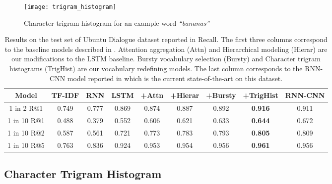 \documentclass[11pt]{report}
\renewcommand\cite{\citep}	%
\begin{document}
\begin{figure}
\texttt{[image: trigram\_histogram]}
\caption{Character trigram histogram for an example word \textit{``bananas''}}
\label{fig:trigram_histogram}
\vspace{-1.0em}
\end{figure}

\begin{table}
\begin{tabular}{  c | c | c | c | c | c | c | c | c }
Model & TF-IDF & RNN & LSTM & +Attn & +Hierar & +Bursty & +TrigHist & RNN-CNN \\ \hline
1 in 2 R@1 & 0.749 & 0.777 & 0.869 & 0.874 & 0.887 & 0.892 & \textbf{0.916} & 0.911\\ 
1 in 10 R@1 & 0.488 & 0.379 & 0.552 & 0.606 & 0.621 & 0.633 & \textbf{0.644} & 0.672\\
1 in 10 R@2 & 0.587 & 0.561 & 0.721 & 0.773 & 0.783 & 0.793 & \textbf{0.805} & 0.809\\ 
1 in 10 R@5 & 0.763 & 0.836 & 0.924 & 0.953 & 0.954 & 0.956 & \textbf{0.961} & 0.956 \\ \hline
\end{tabular}
\caption{Results on the test set of Ubuntu Dialogue dataset reported in Recall. The first three columns correspond to the baseline models described in \cite{lowe2015ubuntu}. Attention aggregation (Attn) and Hierarchical modeling (Hierar) are our modifications to the LSTM baseline. Bursty vocabulary selection (Bursty) and Character trigram histograms (TrigHist) are our vocabulary redefining models. The last column corresponds to the RNN-CNN model reported in \cite{baudivs2016sentence} which is the current state-of-the-art on this dataset.}
\label{results}
\end{table}

\subsection{Character Trigram Histogram} \label{character_trigram_histogram}
\end{document}
